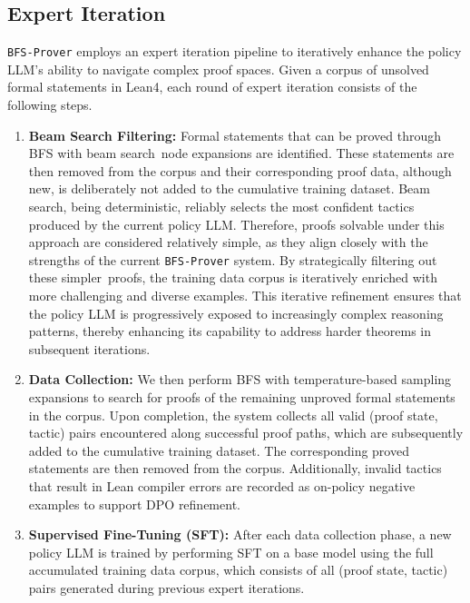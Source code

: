 \documentclass[10pt,english]{article}
\begin{document}
\subsection{Expert Iteration}\label{sec:ei}
\texttt{BFS-Prover} employs an expert iteration pipeline to iteratively enhance the policy LLM’s ability to navigate complex proof spaces. Given a corpus of unsolved formal statements in Lean4, each round of expert iteration consists of the following steps.


\begin{enumerate}

    \item \textbf{Beam Search Filtering:}  
    Formal statements that can be proved through BFS with beam search~node expansions are identified. These statements are then removed from the corpus and their corresponding proof data, although new, is deliberately not added to the cumulative training dataset. Beam search, being deterministic, reliably selects the most confident tactics produced by the current policy LLM. Therefore, proofs solvable under this approach are considered relatively simple, as they align closely with the strengths of the current \texttt{BFS-Prover} system. By strategically filtering out these simpler~proofs, the training data corpus is iteratively enriched with more challenging and diverse examples. This iterative refinement ensures that the policy LLM is progressively exposed to increasingly complex reasoning patterns, thereby enhancing its capability to address harder theorems in subsequent iterations.
    
    \item \textbf{Data Collection:} We then perform BFS with temperature-based sampling expansions to search for proofs of the remaining unproved formal statements in the corpus. Upon completion, the system collects all valid (proof state, tactic) pairs encountered along successful proof paths, which are subsequently added to the cumulative training dataset. The corresponding proved statements are then removed from the corpus.
    Additionally, invalid tactics that result in Lean compiler errors are recorded as on-policy negative examples to support DPO refinement.

    \item \textbf{Supervised Fine-Tuning (SFT):}  
    After each data collection phase, a new policy LLM is trained by performing SFT on a base model using the full accumulated training data corpus, which consists of all (proof state, tactic) pairs generated during previous expert iterations.      


\end{enumerate}
\end{document}
